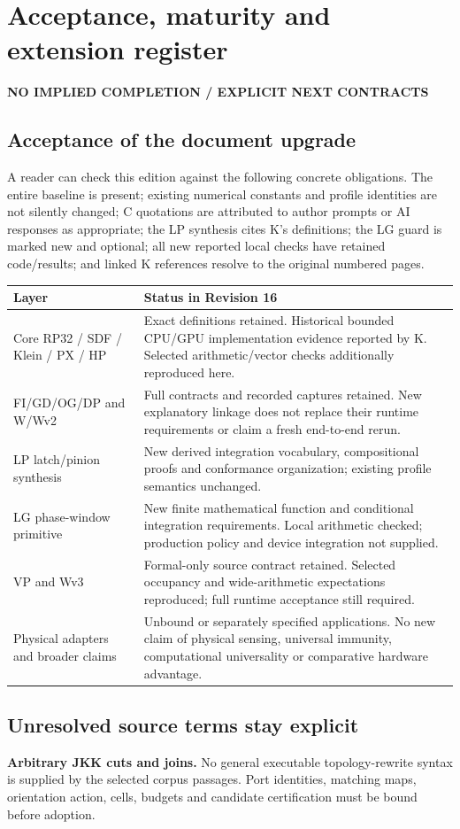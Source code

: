 \documentclass[11pt,a4paper]{article}
\newcommand{\status}[1]{{\sffamily\bfseries\scriptsize\color{teal}#1}\par}
\newcommand{\sectionstart}[1]{\par\addvspace{18pt}\Needspace{12\baselineskip}\section{#1}}
\theoremstyle{lpstyle}
\begin{document}
\sectionstart{Acceptance, maturity and extension register}
\status{NO IMPLIED COMPLETION / EXPLICIT NEXT CONTRACTS}
\subsection{Acceptance of the document upgrade}
A reader can check this edition against the following concrete obligations. The entire baseline is present; existing numerical constants and profile identities are not silently changed; C quotations are attributed to author prompts or AI responses as appropriate; the LP synthesis cites K's definitions; the LG guard is marked new and optional; all new reported local checks have retained code/results; and linked K references resolve to the original numbered pages.

\begin{tabularx}{\textwidth}{L{37mm}Y}
\toprule
\textbf{Layer}&\textbf{Status in Revision 16}\\\midrule
Core RP32 / SDF / Klein / PX / HP&Exact definitions retained. Historical bounded CPU/GPU implementation evidence reported by K. Selected arithmetic/vector checks additionally reproduced here.\\
FI/GD/OG/DP and W/Wv2&Full contracts and recorded captures retained. New explanatory linkage does not replace their runtime requirements or claim a fresh end-to-end rerun.\\
LP latch/pinion synthesis&New derived integration vocabulary, compositional proofs and conformance organization; existing profile semantics unchanged.\\
LG phase-window primitive&New finite mathematical function and conditional integration requirements. Local arithmetic checked; production policy and device integration not supplied.\\
VP and Wv3&Formal-only source contract retained. Selected occupancy and wide-arithmetic expectations reproduced; full runtime acceptance still required.\\
Physical adapters and broader claims&Unbound or separately specified applications. No new claim of physical sensing, universal immunity, computational universality or comparative hardware advantage.\\\bottomrule
\end{tabularx}

\subsection{Unresolved source terms stay explicit}
\textbf{Arbitrary JKK cuts and joins.} No general executable topology-rewrite syntax is supplied by the selected corpus passages. Port identities, matching maps, orientation action, cells, budgets and candidate certification must be bound before adoption.
\end{document}
